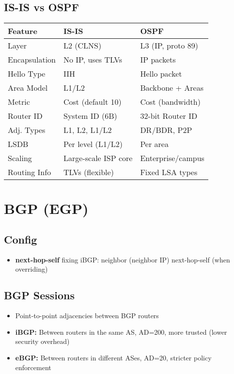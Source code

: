\begin{multicols*}{5}
		\subsection{IS-IS vs OSPF}
		\begin{tabular}{p{1.0cm} | p{1.5cm} | p{1.5cm}}
			\textbf{Feature} & \textbf{IS-IS} & \textbf{OSPF} \\
			\hline
			Layer & L2 (CLNS) & L3 (IP, proto 89) \\
			Encapsulation & No IP, uses TLVs & IP packets \\
			Hello Type & IIH & Hello packet \\
			Area Model & L1/L2 & Backbone + Areas \\
			Metric & Cost (default 10) & Cost (bandwidth) \\
			Router ID & System ID (6B) & 32-bit Router ID \\
			Adj. Types & L1, L2, L1/L2 & DR/BDR, P2P \\
			LSDB & Per level (L1/L2) & Per area \\
			Scaling & Large-scale ISP core & Enterprise/campus \\
			Routing Info & TLVs (flexible) & Fixed LSA types \\
		\end{tabular}
		\section{BGP (EGP)}
		\subsection{Config}
		\begin{itemize}
			\item \textbf{next-hop-self} fixing iBGP: neighbor (neighbor IP) next-hop-self (when overriding)
		\end{itemize}
		\subsection{BGP Sessions}
		\begin{itemize}
			\item Point-to-point adjacencies between BGP routers
			\item \textbf{iBGP:} Between routers in the same AS, AD=200, more trusted (lower security overhead)
			\item \textbf{eBGP:} Between routers in different ASes, AD=20, stricter policy enforcement
		\end{itemize}

\end{multicols*}
